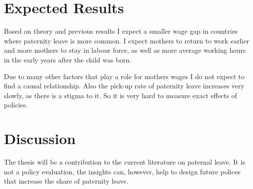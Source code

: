 \documentclass[notitlepage]{report}
\begin{document}
\section*{Expected Results}
\par Based on theory and previous results I expect a smaller wage gap in countries where paternity leave is more common. I expect mothers to return to work earlier and more mothers to stay in labour force, as well as more average working hours in the early years after the child was born.  
\par Due to many other factors that play a role for mothers wages I do not expect to find a causal relationship. Also the pick-up rate of paternity leave increases very slowly, as there is a stigma to it. So it is very hard to measure exact effects of policies. 

\section*{Discussion}
\par The thesis will be a contribution to the current literature on paternal leave. It is not a policy evaluation, the insights can, however,  help to design future polices that increase the share of paternity leave.

\nocite{*}


\end{document}
